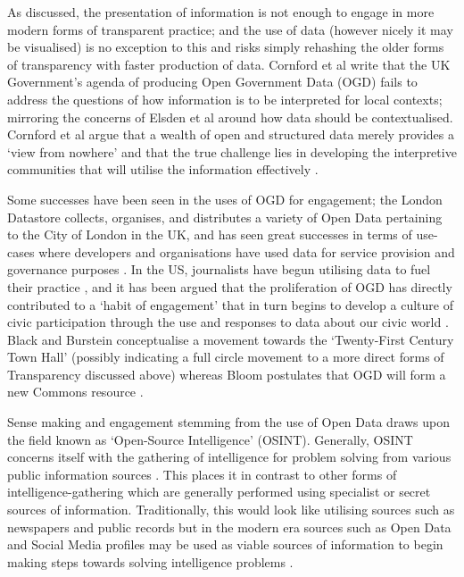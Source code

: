 As discussed, the presentation of information is not enough to engage in more modern forms of transparent practice; and the use of data (however nicely it may be visualised) is no exception to this and risks simply rehashing the older forms of transparency with faster production of data. Cornford et al write that the UK Government's agenda of producing Open Government Data (OGD) fails to address the questions of how information is to be interpreted for local contexts; mirroring the concerns of Elsden et al around how data should be contextualised. Cornford et al argue that a wealth of open and structured data merely provides a `view from nowhere' and that the true challenge lies in developing the interpretive communities that will utilise the information effectively \cite{cornford_local_2013}.

Some successes have been seen in the uses of OGD for engagement; the London Datastore \cite{noauthor_london_nodate} collects, organises, and distributes a variety of Open Data pertaining to the City of London in the UK, and has seen great successes in terms of use-cases where developers and organisations have used data for service provision and governance purposes \cite{coleman_lessons_2013}. In the US, journalists have begun utilising data to fuel their practice \cite{ramos_journalists_2013}, and it has been argued that the proliferation of OGD has directly contributed to a `habit of engagement' that in turn begins to develop a culture of civic participation through the use and responses to data about our civic world \cite{gordon_making_2013-1}. Black and Burstein conceptualise a movement towards the `Twenty-First Century Town Hall' \cite{black_local_2013} (possibly indicating a full circle movement to a more direct forms of Transparency discussed above) whereas Bloom postulates that OGD will form a new Commons resource \cite{bloom_towards_2013}.

Sense making and engagement stemming from the use of Open Data draws upon the field known as `Open-Source Intelligence' (OSINT). Generally, OSINT concerns itself with the gathering of intelligence for problem solving from various public information sources \cite{bradbury_plain_2011, glassman_intelligence_2012}. This places it in contrast to other forms of intelligence-gathering which are generally performed using specialist or secret sources of information. Traditionally, this would look like utilising sources such as newspapers and public records but in the modern era sources such as Open Data and Social Media profiles may be used as viable sources of information to begin making steps towards solving intelligence problems \cite{bizer_emerging_2009}.

